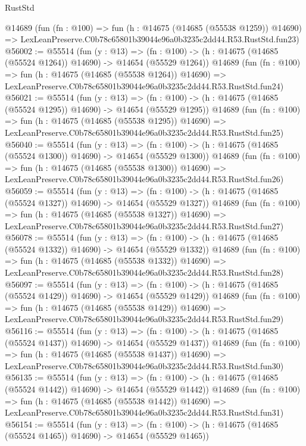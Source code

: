 \begin{lexlean}{RustStd}
\begin{coremodule}
    @14689
    (fun (fn : @100) =>
    fun (h : @14675 (@14685 (@55538 @1259)) @14690) =>
    LexLeanPreserve.C0b78c65801b39044e96a0b3235c2dd44.R53.RustStd.fun23)
@56002 := @55514
    (fun (y : @13) =>
    (fn : @100) -> (h : @14675 (@14685 (@55524 @1264)) @14690) -> @14654 (@55529 @1264))
    @14689
    (fun (fn : @100) =>
    fun (h : @14675 (@14685 (@55538 @1264)) @14690) =>
    LexLeanPreserve.C0b78c65801b39044e96a0b3235c2dd44.R53.RustStd.fun24)
@56021 := @55514
    (fun (y : @13) =>
    (fn : @100) -> (h : @14675 (@14685 (@55524 @1295)) @14690) -> @14654 (@55529 @1295))
    @14689
    (fun (fn : @100) =>
    fun (h : @14675 (@14685 (@55538 @1295)) @14690) =>
    LexLeanPreserve.C0b78c65801b39044e96a0b3235c2dd44.R53.RustStd.fun25)
@56040 := @55514
    (fun (y : @13) =>
    (fn : @100) -> (h : @14675 (@14685 (@55524 @1300)) @14690) -> @14654 (@55529 @1300))
    @14689
    (fun (fn : @100) =>
    fun (h : @14675 (@14685 (@55538 @1300)) @14690) =>
    LexLeanPreserve.C0b78c65801b39044e96a0b3235c2dd44.R53.RustStd.fun26)
@56059 := @55514
    (fun (y : @13) =>
    (fn : @100) -> (h : @14675 (@14685 (@55524 @1327)) @14690) -> @14654 (@55529 @1327))
    @14689
    (fun (fn : @100) =>
    fun (h : @14675 (@14685 (@55538 @1327)) @14690) =>
    LexLeanPreserve.C0b78c65801b39044e96a0b3235c2dd44.R53.RustStd.fun27)
@56078 := @55514
    (fun (y : @13) =>
    (fn : @100) -> (h : @14675 (@14685 (@55524 @1332)) @14690) -> @14654 (@55529 @1332))
    @14689
    (fun (fn : @100) =>
    fun (h : @14675 (@14685 (@55538 @1332)) @14690) =>
    LexLeanPreserve.C0b78c65801b39044e96a0b3235c2dd44.R53.RustStd.fun28)
@56097 := @55514
    (fun (y : @13) =>
    (fn : @100) -> (h : @14675 (@14685 (@55524 @1429)) @14690) -> @14654 (@55529 @1429))
    @14689
    (fun (fn : @100) =>
    fun (h : @14675 (@14685 (@55538 @1429)) @14690) =>
    LexLeanPreserve.C0b78c65801b39044e96a0b3235c2dd44.R53.RustStd.fun29)
@56116 := @55514
    (fun (y : @13) =>
    (fn : @100) -> (h : @14675 (@14685 (@55524 @1437)) @14690) -> @14654 (@55529 @1437))
    @14689
    (fun (fn : @100) =>
    fun (h : @14675 (@14685 (@55538 @1437)) @14690) =>
    LexLeanPreserve.C0b78c65801b39044e96a0b3235c2dd44.R53.RustStd.fun30)
@56135 := @55514
    (fun (y : @13) =>
    (fn : @100) -> (h : @14675 (@14685 (@55524 @1442)) @14690) -> @14654 (@55529 @1442))
    @14689
    (fun (fn : @100) =>
    fun (h : @14675 (@14685 (@55538 @1442)) @14690) =>
    LexLeanPreserve.C0b78c65801b39044e96a0b3235c2dd44.R53.RustStd.fun31)
@56154 := @55514
    (fun (y : @13) =>
    (fn : @100) -> (h : @14675 (@14685 (@55524 @1465)) @14690) -> @14654 (@55529 @1465))

\end{coremodule}
\end{lexlean}
